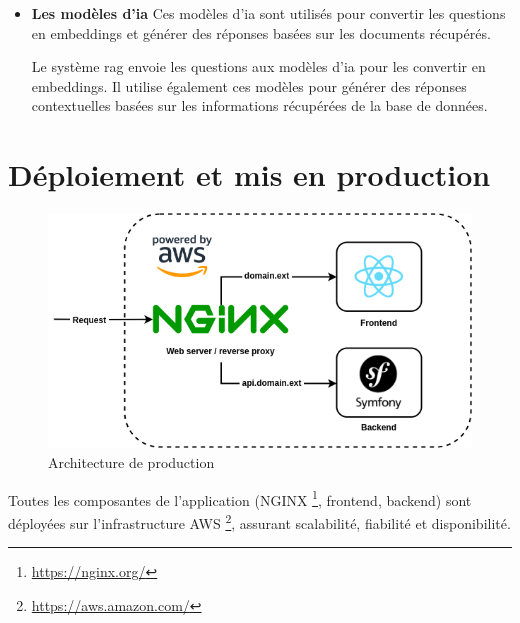 \begin{itemize}
    Lorsqu'une requête nécessite une réponse contextuelle, Symfony appelle le système \ac{rag}. Ce système utilise les embeddings stockés dans PostgreSQL pour trouver les documents pertinents, puis génère une réponse en s'appuyant sur des modèles d'\ac{ia} (comme ceux de Mistral AI \footnote{\href{https://console.mistral.ai/}{https://console.mistral.ai/}} et OpenAI \footnote{\href{https://openai.com/}{https://openai.com/}}).

    \item \textbf{Les modèles d'\ac{ia}}
    Ces modèles d'\ac{ia} sont utilisés pour convertir les questions en embeddings et générer des réponses basées sur les documents récupérés.
    
    Le système \ac{rag} envoie les questions aux modèles d'\ac{ia} pour les convertir en embeddings. Il utilise également ces modèles pour générer des réponses contextuelles basées sur les informations récupérées de la base de données.
\end{itemize}

\section{Déploiement et mis en production}
\label{ch:2:section:deploy}

\begin{figure}[H]
    \centering
    \includegraphics[width=15cm]{gfx/fig-deploy-architecture.png}
    \caption{Architecture de production}
    \label{fig:deploy-architecture}
\end{figure}

Toutes les composantes de l'application (NGINX \footnote{\href{https://nginx.org/}{https://nginx.org/}}, frontend, backend) sont déployées sur l'infrastructure AWS \footnote{\href{https://aws.amazon.com/}{https://aws.amazon.com/}}, assurant scalabilité, fiabilité et disponibilité.

